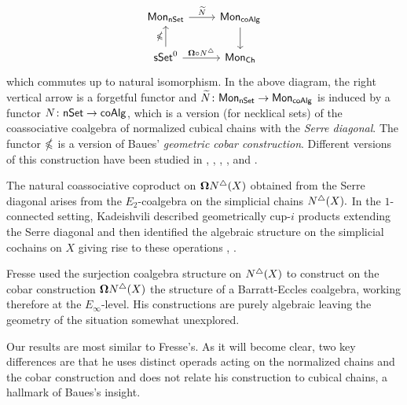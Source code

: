 \begin{equation*}
\begin{tikzcd}
\Mon_{\nSet} \arrow[r, "\widetilde{N}"] & \Mon_{\coAlg} \arrow[d] \\
\sSet^0 \arrow[r, "\cobar \circ \chains"] \arrow[u, "\gcobar"] & \Mon_{\Ch}
\end{tikzcd}
\end{equation*}
which commutes up to natural isomorphism. In the above diagram, the right vertical arrow is a forgetful functor and $\widetilde{N} \colon \mathsf{Mon}_{\mathsf{nSet}} \to \mathsf{Mon}_{\mathsf{coAlg}}$ is induced by a functor $N \colon \mathsf{nSet} \to \mathsf{coAlg}$, which is a version (for necklical sets) of the coassociative coalgebra of normalized cubical chains with the \textit{Serre diagonal}. The functor $\mathbb{\Omega}$ is a version of Baues' \textit{geometric cobar construction}. Different versions of this construction have been studied in \cite{Cordier}, \cite{Dugger, Spivak}, \cite{Kaufmann, Galvez, Tonks}, \cite{Rivera-Zeinalian}, and \cite{Berger thesis}.

The natural coassociative coproduct on $\mathbf{\Omega} N^{\triangle} (X)$ obtained from the Serre diagonal arises from the $E_2$-coalgebra on the simplicial chains $N^{\triangle}(X).$ In the $1$-connected setting, Kadeishvili described geometrically cup-$i$ products extending the Serre diagonal and then identified the algebraic structure on the simplicial cochains on $X$ giving rise to these operations \cite{Kadeishvili99coproducts},  \cite{Pilarczyk2016cubical}.

Fresse \cite{Fresse03construction} used the surjection coalgebra structure on $N^{\triangle}(X)$ to construct on the cobar construction $\mathbf{\Omega}N^{\triangle}(X)$ the  structure of a Barratt-Eccles coalgebra, working therefore at the $E_\infty$-level. His constructions are purely algebraic leaving the geometry of the situation somewhat unexplored.

Our results are most similar to Fresse's.
As it will become clear, two key differences are that he uses distinct operads acting on the normalized chains and the cobar construction and does not relate his construction to cubical chains, a hallmark of Baues's insight.

